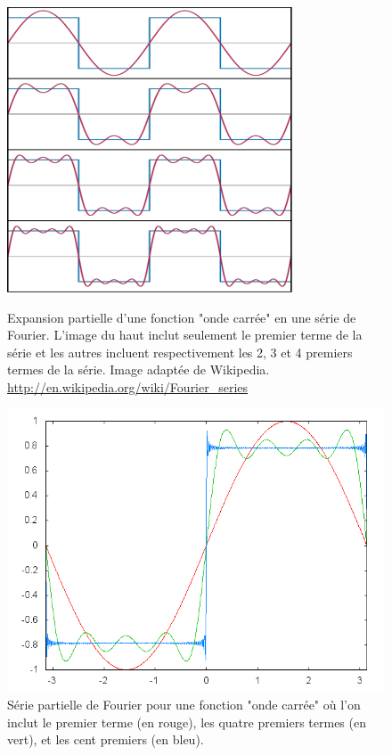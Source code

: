 \begin{figure}[h]
\begin{minipage}{0.45\textwidth}
\includegraphics[width=\textwidth]{./images/fourier2}
\caption{Expansion partielle d'une fonction "onde carrée" en une série de Fourier. L'image
du haut inclut seulement le premier terme de la série et les autres
incluent respectivement les 2, 3 et 4 premiers termes de la série. Image adaptée de Wikipedia.
{\tiny \url{http://en.wikipedia.org/wiki/Fourier_series}}}
\end{minipage}\hfill
\begin{minipage}{0.5\textwidth}
\includegraphics[width=\textwidth]{./images/fourier}
\caption{Série partielle de Fourier pour une fonction "onde carrée"
où l'on inclut le premier terme (en rouge), les quatre premiers termes (en vert), 
et les cent premiers (en bleu).}
\end{minipage}
\end{figure}

